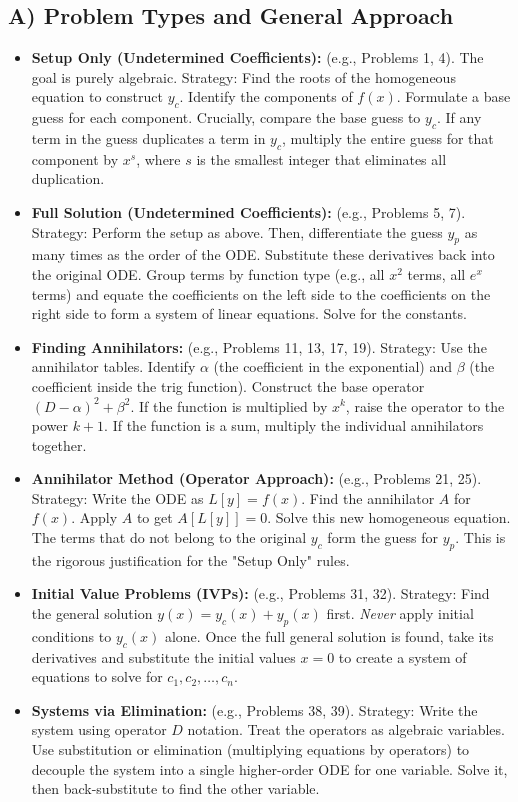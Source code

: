\documentclass[11pt]{article}
\begin{document}
\subsection{A) Problem Types and General Approach}
\begin{itemize}
    \item \textbf{Setup Only (Undetermined Coefficients):} (e.g., Problems 1, 4). The goal is purely algebraic. Strategy: Find the roots of the homogeneous equation to construct $y_c$. Identify the components of $f(x)$. Formulate a base guess for each component. Crucially, compare the base guess to $y_c$. If any term in the guess duplicates a term in $y_c$, multiply the entire guess for that component by $x^s$, where $s$ is the smallest integer that eliminates all duplication.
    \item \textbf{Full Solution (Undetermined Coefficients):} (e.g., Problems 5, 7). Strategy: Perform the setup as above. Then, differentiate the guess $y_p$ as many times as the order of the ODE. Substitute these derivatives back into the original ODE. Group terms by function type (e.g., all $x^2$ terms, all $e^x$ terms) and equate the coefficients on the left side to the coefficients on the right side to form a system of linear equations. Solve for the constants.
    \item \textbf{Finding Annihilators:} (e.g., Problems 11, 13, 17, 19). Strategy: Use the annihilator tables. Identify $\alpha$ (the coefficient in the exponential) and $\beta$ (the coefficient inside the trig function). Construct the base operator $(D-\alpha)^2 + \beta^2$. If the function is multiplied by $x^k$, raise the operator to the power $k+1$. If the function is a sum, multiply the individual annihilators together.
    \item \textbf{Annihilator Method (Operator Approach):} (e.g., Problems 21, 25). Strategy: Write the ODE as $L[y] = f(x)$. Find the annihilator $A$ for $f(x)$. Apply $A$ to get $A[L[y]] = 0$. Solve this new homogeneous equation. The terms that do not belong to the original $y_c$ form the guess for $y_p$. This is the rigorous justification for the "Setup Only" rules.
    \item \textbf{Initial Value Problems (IVPs):} (e.g., Problems 31, 32). Strategy: Find the general solution $y(x) = y_c(x) + y_p(x)$ first. \textit{Never} apply initial conditions to $y_c(x)$ alone. Once the full general solution is found, take its derivatives and substitute the initial values $x=0$ to create a system of equations to solve for $c_1, c_2, \dots, c_n$.
    \item \textbf{Systems via Elimination:} (e.g., Problems 38, 39). Strategy: Write the system using operator $D$ notation. Treat the operators as algebraic variables. Use substitution or elimination (multiplying equations by operators) to decouple the system into a single higher-order ODE for one variable. Solve it, then back-substitute to find the other variable.
\end{itemize}
\end{document}
